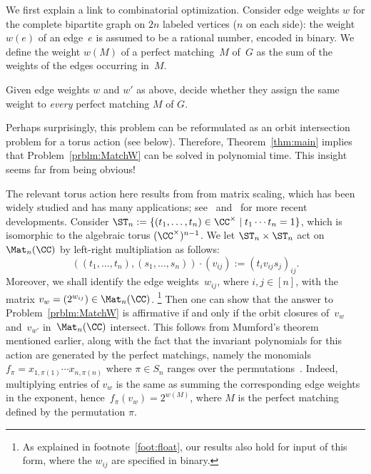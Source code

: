 We first explain a link to combinatorial optimization.
Consider edge weights $w$ for the complete bipartite graph on $2n$ labeled vertices ($n$ on each side):
the weight $w(e)$ of an edge~$e$ is assumed to be a rational number, encoded in binary.
We define the weight $w(M)$ of a perfect matching~$M$ of~$G$ as the sum of the weights of the edges occurring in~$M$.

\begin{problem}\label{prblm:MatchW}
Given edge weights $w$ and $w'$ as above, decide whether they assign the same weight to \emph{every} perfect matching $M$ of $G$.
\end{problem}

Perhaps surprisingly, this problem can be reformulated as an orbit intersection problem for
a torus action (see below).
Therefore, Theorem~\ref{thm:main} implies that Problem~\ref{prblm:MatchW} can be solved in polynomial time.
This insight seems far from being obvious!

The relevant torus action here results from from matrix scaling, which has been widely studied and has
many applications; see~\cite{Sink} and~\cite{cohen2017matrix} for more recent developments.
%
Consider $\ST_n:= \{ (t_1,\ldots,t_n) \in \CC^\times \mid t_1\cdots t_n =1\}$, which is isomorphic to the algebraic torus $(\CC^{\times})^{n-1}$.
We let $\ST_n\times\ST_n$ act on $\Mat_n(\CC)$ by left-right multipliation as follows:
\begin{equation}\label{eq:ma-scal}
 ((t_1,\ldots,t_n),(s_1,\ldots,s_n)) \cdot (v_{ij}) := (t_i v_{ij} s_j)_{ij} .
\end{equation}
Moreover, we shall identify the edge weights~$w_{ij}$, where $i,j \in [n]$, with the matrix $v_w=(2^{w_{ij}}) \in\Mat_n(\CC)$.
\footnote{As explained in footnote~\ref{foot:float}, our results also hold for input of this form, where the $w_{ij}$ are specified in binary.}
Then one can show that the answer to Problem~\ref{prblm:MatchW} is affirmative if and only if the orbit closures of~$v_w$ and~$v_{w'}$ in~$\Mat_n(\CC)$ intersect.
This follows from Mumford's theorem mentioned earlier, along with the fact that the invariant polynomials for this action are generated by the perfect matchings, namely the monomials~$f_\pi = x_{1,\pi(1)} \cdots x_{n,\pi(n)}$ where $\pi\in S_n$ ranges over the permutations~\cite[Theorem~3]{leep1999marriage}.
Indeed, multiplying entries of $v_{w}$ is the same as summing the corresponding edge weights in the exponent, hence~$f_\pi(v_w) = 2^{w(M)}$, where $M$ is the perfect matching defined by the permutation $\pi$.

